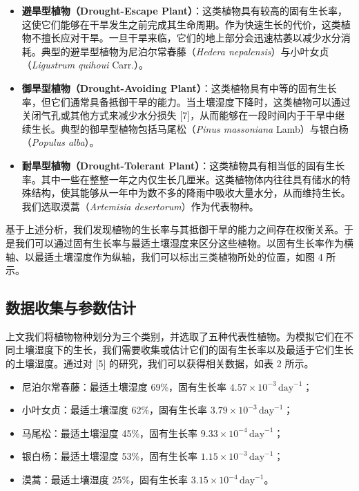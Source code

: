 \documentclass[11pt,a4paper]{ctexart}
\begin{document}
\begin{itemize}
\item \textbf{避旱型植物（Drought-Escape Plant）}：这类植物具有较高的固有生长率，这使它们能够在干旱发生之前完成其生命周期。作为快速生长的代价，这类植物不擅长应对干旱。一旦干旱来临，它们的地上部分会迅速枯萎以减少水分消耗。典型的避旱型植物为尼泊尔常春藤（\textit{Hedera nepalensis}）与小叶女贞（\textit{Ligustrum quihoui} Carr.）。
\item \textbf{御旱型植物（Drought-Avoiding Plant）}：这类植物具有中等的固有生长率，但它们通常具备抵御干旱的能力。当土壤湿度下降时，这类植物可以通过关闭气孔或其他方式来减少水分损失 [7]，从而能够在一段时间内于干旱中继续生长。典型的御旱型植物包括马尾松（\textit{Pinus massoniana} Lamb）与银白杨（\textit{Populus alba}）。
\item \textbf{耐旱型植物（Drought-Tolerant Plant）}：这类植物具有相当低的固有生长率。其中一些在整整一年之内仅生长几厘米。这类植物体内往往具有储水的特殊结构，使其能够从一年中为数不多的降雨中吸收大量水分，从而维持生长。我们选取漠蒿（\textit{Artemisia desertorum}）作为代表物种。
\end{itemize}

基于上述分析，我们发现植物的生长率与其抵御干旱的能力之间存在权衡关系。于是我们可以通过固有生长率与最适土壤湿度来区分这些植物。以固有生长率作为横轴、以最适土壤湿度作为纵轴，我们可以标出三类植物所处的位置，如图 4 所示。

\subsection{数据收集与参数估计}

上文我们将植物物种划分为三个类别，并选取了五种代表性植物。为模拟它们在不同土壤湿度下的生长，我们需要收集或估计它们的固有生长率以及最适于它们生长的土壤湿度。通过对 [5] 的研究，我们可以获得相关数据，如表 2 所示。

\begin{itemize}
\item 尼泊尔常春藤：最适土壤湿度 69\%，固有生长率 $4.57\times 10^{-3}\,\mathrm{day}^{-1}$；
\item 小叶女贞：最适土壤湿度 62\%，固有生长率 $3.79\times 10^{-3}\,\mathrm{day}^{-1}$；
\item 马尾松：最适土壤湿度 45\%，固有生长率 $9.33\times 10^{-4}\,\mathrm{day}^{-1}$；
\item 银白杨：最适土壤湿度 53\%，固有生长率 $1.15\times 10^{-3}\,\mathrm{day}^{-1}$；
\item 漠蒿：最适土壤湿度 25\%，固有生长率 $3.15\times 10^{-4}\,\mathrm{day}^{-1}$。
\end{itemize}
\end{document}
